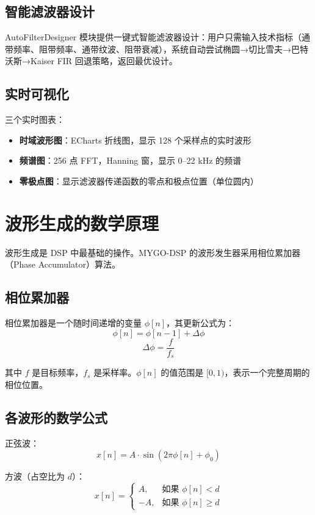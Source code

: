 ﻿\documentclass[12pt,a4paper,oneside]{ctexbook}
\begin{document}
\subsection{智能滤波器设计}

AutoFilterDesigner 模块提供一键式智能滤波器设计：用户只需输入技术指标（通带频率、阻带频率、通带纹波、阻带衰减），系统自动尝试椭圆→切比雪夫→巴特沃斯→Kaiser FIR 回退策略，返回最优设计。

\subsection{实时可视化}

三个实时图表：
\begin{itemize}
    \item \textbf{时域波形图}：ECharts 折线图，显示 128 个采样点的实时波形
    \item \textbf{频谱图}：256 点 FFT，Hanning 窗，显示 0--22 kHz 的频谱
    \item \textbf{零极点图}：显示滤波器传递函数的零点和极点位置（单位圆内）
\end{itemize}

\section{波形生成的数学原理}

波形生成是 DSP 中最基础的操作。MYGO-DSP 的波形发生器采用相位累加器（Phase Accumulator）算法。

\subsection{相位累加器}

相位累加器是一个随时间递增的变量 \(\phi[n]\)，其更新公式为：
\[
\phi[n] = \phi[n-1] + \Delta\phi
\]
\[
\Delta\phi = \frac{f}{f_s}
\]

其中 \(f\) 是目标频率，\(f_s\) 是采样率。\(\phi[n]\) 的值范围是 \([0, 1)\)，表示一个完整周期的相位位置。

\subsection{各波形的数学公式}

正弦波：
\[
x[n] = A \cdot \sin(2\pi \phi[n] + \phi_0)
\]

方波（占空比为 \(d\)）：
\[
x[n] = \begin{cases}
A, & \text{如果 } \phi[n] < d \\
-A, & \text{如果 } \phi[n] \geq d
\end{cases}
\]
\end{document}
